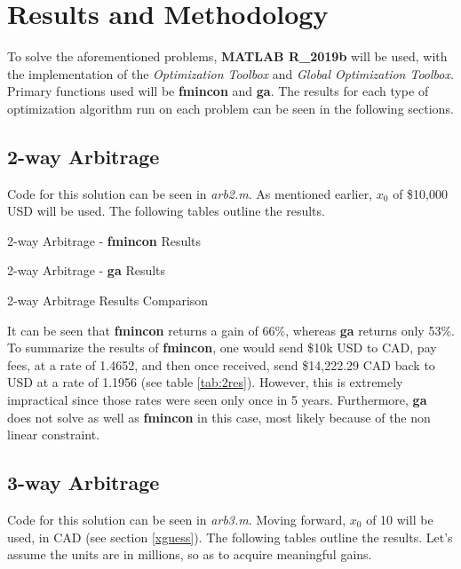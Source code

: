\documentclass[12pt]{article}
\begin{document}
\section{Results and Methodology}
To solve the aforementioned problems, \textbf{MATLAB R\_2019b} will be used, with the implementation of the \textit{Optimization Toolbox} and \textit{Global Optimization Toolbox}. Primary functions used will be \textbf{fmincon} and \textbf{ga}. The results for each type of optimization algorithm run on each problem can be seen in the following sections.

\subsection{2-way Arbitrage}
Code for this solution can be seen in \textit{arb2.m}. As mentioned earlier, $x_{0}$ of \$10,000 USD will be used. The following tables outline the results.
\begin{table}[H]
    \centering
    
    \caption{2-way Arbitrage - \textbf{fmincon} Results}
    \label{tab:2fm}
\end{table}

\begin{table}[H]
    \centering
    
    \caption{2-way Arbitrage - \textbf{ga} Results}
    \label{tab:2ga}
\end{table}

\begin{table}[H]
    \centering
    
    \caption{2-way Arbitrage Results Comparison}
    \label{tab:2res}
\end{table}
It can be seen that \textbf{fmincon} returns a gain of 66\%, whereas \textbf{ga} returns only 53\%. To summarize the results of \textbf{fmincon}, one would send \$10k USD to CAD, pay fees, at a rate of 1.4652, and then once received, send \$14,222.29 CAD back to USD at a rate of 1.1956 (see table \ref{tab:2res}). However, this is extremely impractical since those rates were seen only once in 5 years. Furthermore, \textbf{ga} does not solve as well as \textbf{fmincon} in this case, most likely because of the non linear constraint.

\subsection{3-way Arbitrage}
Code for this solution can be seen in \textit{arb3.m}. Moving forward, $x_{0}$ of 10 will be used, in CAD (see section  \ref{xguess}). The following tables outline the results. Let's assume the units are in millions, so as to acquire meaningful gains.
\end{document}
